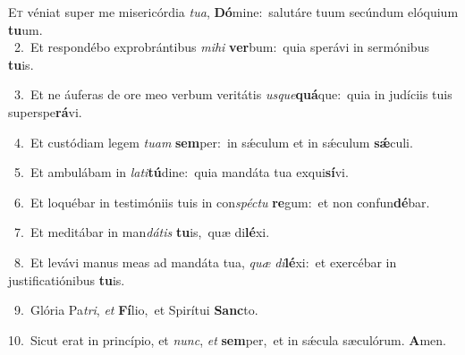 \lettrine{\initial\textcolor{\initialcolor}{E}}{t} véniat super me misericórdia \textit{tu}\-\textit{a}, \textbf{Dó}\-mine:~\star salutáre tuum secúndum elóquium \textbf{tu}\-um.\\
{\numbfont\textcolor{\numbcolor}{~2.}}~Et respondébo exprobrántibus \textit{mi}\-\textit{hi} \textbf{ver}\-bum:~\star quia sperávi in sermónibus \textbf{tu}\-is.\par
{\numbfont\textcolor{\numbcolor}{~3.}}~Et ne áuferas de ore meo verbum veritátis \textit{us}\-\textit{que}\textbf{quá}que:~\star quia in judíciis tuis superspe\-\textbf{rá}\-vi.\par
{\numbfont\textcolor{\numbcolor}{~4.}}~Et custódiam legem \textit{tu}\-\textit{am} \textbf{sem}\-per:~\star in sǽculum et in sǽculum \textbf{sǽ}\-culi.\par
{\numbfont\textcolor{\numbcolor}{~5.}}~Et ambulábam in \textit{la}\-\textit{ti}\textbf{tú}dine:~\star quia mandáta tua exqui\-\textbf{sí}\-vi.\par
{\numbfont\textcolor{\numbcolor}{~6.}}~Et loquébar in testimóniis tuis in con\-\textit{spéc}\-\textit{tu} \textbf{re}\-gum:~\star et non confun\-\textbf{dé}\-bar.\par
{\numbfont\textcolor{\numbcolor}{~7.}}~Et meditábar in man\-\textit{dá}\-\textit{tis} \textbf{tu}\-is,~\star quæ di\-\textbf{lé}\-xi.\par
{\numbfont\textcolor{\numbcolor}{~8.}}~Et levávi manus meas ad mandáta tua, \textit{quæ} \textit{di}\-\textbf{lé}xi:~\star et exercébar in justificatiónibus \textbf{tu}\-is.\par
{\numbfont\textcolor{\numbcolor}{~9.}}~Glória Pa\-\textit{tri}\-, \textit{et} \textbf{Fí}\-lio,~\star et Spirítui \textbf{Sanc}\-to.\par
{\numbfont\textcolor{\numbcolor}{10.}}~Sicut erat in princípio, et \textit{nunc}\-, \textit{et} \textbf{sem}\-per,~\star et in sǽcula sæculórum. \textbf{A}\-men.\par
